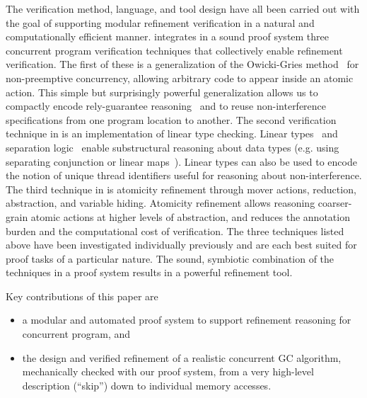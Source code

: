 The verification method, language, and tool design have all been carried out with the goal of supporting  modular refinement verification in a natural and computationally efficient manner. 
\civl integrates in a sound proof system three concurrent program verification techniques that collectively enable refinement verification. 
The first of these is a generalization of the Owicki-Gries method~\cite{OwickiG76} for non-preemptive concurrency, 
allowing arbitrary code to appear inside an atomic action. 
This simple but surprisingly powerful generalization allows us to compactly encode rely-guarantee reasoning~\cite{Jones83}
and to reuse non-interference specifications from one program location to another.
The second verification technique in \civl is an implementation of linear type checking.
Linear types~\cite{Wadler90lineartypes} and separation logic~\cite{Reynolds02} enable substructural reasoning about data types
(e.g. using separating conjunction or linear maps~\cite{LahiriQW11}).
Linear types can also be used to encode the notion of unique thread identifiers useful for reasoning about non-interference. 
The third technique in \civl is atomicity refinement through mover actions, reduction, abstraction, and variable hiding. 
Atomicity refinement allows reasoning coarser-grain atomic actions at higher levels of abstraction, and reduces the annotation burden and the computational cost of verification. 
The three techniques listed above have been investigated individually previously and are each best suited for proof tasks of a particular nature. 
The sound, symbiotic combination of the techniques in a proof system results in a powerful refinement tool. 

Key contributions of this paper are 
\begin{itemize}
\item a modular and automated proof system to support refinement reasoning for concurrent program, and 
\item the design and verified refinement of a realistic concurrent GC algorithm, mechanically checked with our proof system, from a very high-level description (``skip'') down to individual memory accesses.
\end{itemize}



